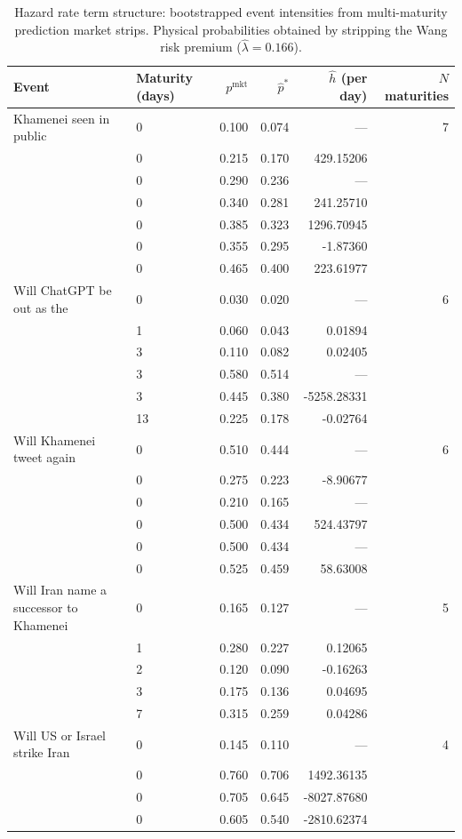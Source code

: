 \begin{table}[H]
\centering
\small
\caption{Hazard rate term structure: bootstrapped event intensities from multi-maturity prediction market strips. Physical probabilities obtained by stripping the Wang risk premium ($\hat{\lambda} = 0.166$).}
\label{tab:hazard_rate}
\begin{tabular}{llrrrr}
\toprule
Event & Maturity (days) & $p^{\text{mkt}}$ & $\hat{p}^*$ & $\hat{h}$ (per day) & $N$ maturities \\
\midrule
Khamenei seen in public & 0 & 0.100 & 0.074 & --- & 7 \\
 & 0 & 0.215 & 0.170 & 429.15206 &  \\
 & 0 & 0.290 & 0.236 & --- &  \\
 & 0 & 0.340 & 0.281 & 241.25710 &  \\
 & 0 & 0.385 & 0.323 & 1296.70945 &  \\
 & 0 & 0.355 & 0.295 & -1.87360 &  \\
 & 0 & 0.465 & 0.400 & 223.61977 &  \\
\midrule
Will ChatGPT be out as the #1 Free App i & 0 & 0.030 & 0.020 & --- & 6 \\
 & 1 & 0.060 & 0.043 & 0.01894 &  \\
 & 3 & 0.110 & 0.082 & 0.02405 &  \\
 & 3 & 0.580 & 0.514 & --- &  \\
 & 3 & 0.445 & 0.380 & -5258.28331 &  \\
 & 13 & 0.225 & 0.178 & -0.02764 &  \\
\midrule
Will Khamenei tweet again & 0 & 0.510 & 0.444 & --- & 6 \\
 & 0 & 0.275 & 0.223 & -8.90677 &  \\
 & 0 & 0.210 & 0.165 & --- &  \\
 & 0 & 0.500 & 0.434 & 524.43797 &  \\
 & 0 & 0.500 & 0.434 & --- &  \\
 & 0 & 0.525 & 0.459 & 58.63008 &  \\
\midrule
Will Iran name a successor to Khamenei & 0 & 0.165 & 0.127 & --- & 5 \\
 & 1 & 0.280 & 0.227 & 0.12065 &  \\
 & 2 & 0.120 & 0.090 & -0.16263 &  \\
 & 3 & 0.175 & 0.136 & 0.04695 &  \\
 & 7 & 0.315 & 0.259 & 0.04286 &  \\
\midrule
Will US or Israel strike Iran & 0 & 0.145 & 0.110 & --- & 4 \\
 & 0 & 0.760 & 0.706 & 1492.36135 &  \\
 & 0 & 0.705 & 0.645 & -8027.87680 &  \\
 & 0 & 0.605 & 0.540 & -2810.62374 &  \\
\bottomrule
\end{tabular}
\end{table}